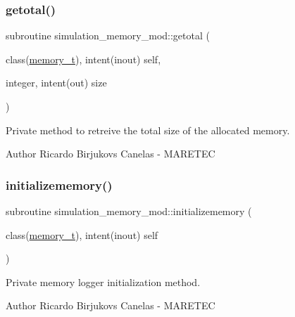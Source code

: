 \subsubsection{\texorpdfstring{getotal()}{getotal()}}
{\footnotesize\ttfamily subroutine simulation\+\_\+memory\+\_\+mod\+::getotal (\begin{DoxyParamCaption}\item[{class(\hyperlink{structsimulation__memory__mod_1_1memory__t}{memory\+\_\+t}), intent(inout)}]{self,  }\item[{integer, intent(out)}]{size }\end{DoxyParamCaption})\hspace{0.3cm}{\ttfamily [private]}}



Private method to retreive the total size of the allocated memory. 

\begin{DoxyAuthor}{Author}
Ricardo Birjukovs Canelas -\/ M\+A\+R\+E\+T\+EC 
\end{DoxyAuthor}
\mbox{\label{namespacesimulation__memory__mod_ac8306165e4ec88fec9a2b8b719f61893}} 
\subsubsection{\texorpdfstring{initializememory()}{initializememory()}}
{\footnotesize\ttfamily subroutine simulation\+\_\+memory\+\_\+mod\+::initializememory (\begin{DoxyParamCaption}\item[{class(\hyperlink{structsimulation__memory__mod_1_1memory__t}{memory\+\_\+t}), intent(inout)}]{self }\end{DoxyParamCaption})\hspace{0.3cm}{\ttfamily [private]}}



Private memory logger initialization method. 

\begin{DoxyAuthor}{Author}
Ricardo Birjukovs Canelas -\/ M\+A\+R\+E\+T\+EC 
\end{DoxyAuthor}
\mbox{\label{namespacesimulation__memory__mod_a16a7a1c7e88fe5a5523d23f83f0e04a0}} 
